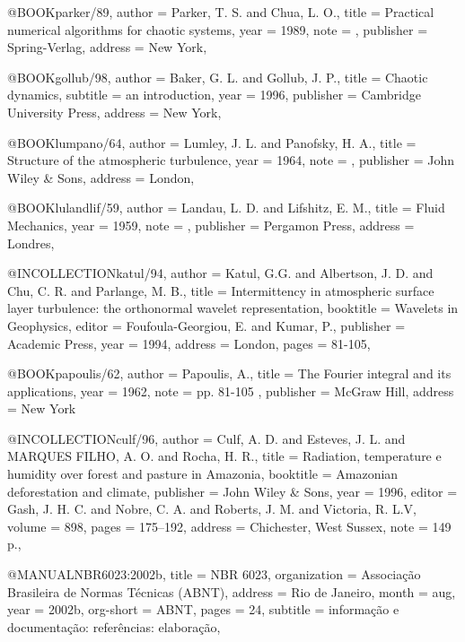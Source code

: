 @BOOK{parker/89,
author              = {Parker, T. S. and Chua, L. O.},
title               = {Practical numerical algorithms for chaotic systems},
year                = {1989},
note                = { },
publisher           = {Spring-Verlag},
address             = {New York},
}

@BOOK{gollub/98,
author              = {Baker, G. L. and Gollub, J. P.},
title               = {Chaotic dynamics},
subtitle 	          = {an introduction},
year                = {1996},
publisher           = {Cambridge University Press},
address             = {New York},
}

@BOOK{lumpano/64,
author              = {Lumley, J. L. and Panofsky, H. A.},
title               = {Structure of the atmospheric turbulence},
year                = {1964},
note                = { },
publisher           = {John Wiley \& Sons},
address             = {London},
}

@BOOK{lulandlif/59,
author              = {Landau, L. D. and Lifshitz, E. M.},
title               = {Fluid Mechanics},
year                = {1959},
note                = { },
publisher           = {Pergamon Press},
address             = {Londres},
}


@INCOLLECTION{katul/94, 
   author = {Katul, G.G. and Albertson, J. D. and Chu, C. R. and Parlange, M. B.},
   title  = {Intermittency in atmospheric surface layer turbulence: the orthonormal wavelet representation},
   booktitle  = {Wavelets in Geophysics},
   editor = {Foufoula-Georgiou, E. and Kumar, P.},
   publisher  = {Academic Press},
   year       = {1994},
   address    = {London},
   pages      = {81-105},   
}

@BOOK{papoulis/62,
 author              = {Papoulis, A.},
 title               = { The Fourier integral and its applications},
 year                = 1962,
 note                = {pp. 81-105 },
 publisher           = { McGraw Hill},
 address             = { New York}
}

@INCOLLECTION{culf/96,
  author = {Culf, A. D. and Esteves, J. L. and {MARQUES FILHO}, A. O. and Rocha, H. R.},
  title = {Radiation, temperature e humidity over forest and pasture in Amazonia},
  booktitle = {Amazonian deforestation and climate},
  publisher = {John Wiley \& Sons},
  year = {1996},
  editor = {Gash, J. H. C. and Nobre, C. A. and Roberts, J. M. and Victoria, R. L.V},
  volume = {898},
  pages = {175--192},
  address = {Chichester, West Sussex},
  note = {149 p.},
}

@MANUAL{NBR6023:2002b,
  title = {{NBR} 6023},
  organization = {Associa{\c{c}}{\~a}o Brasileira de Normas T{\'e}cnicas (ABNT)},
  address = {Rio de Janeiro},
  month = aug,
  year = {2002b},
  org-short = {ABNT},
  pages = {24},
  subtitle = {informa{\c{c}}{\~a}o e documenta{\c{c}}{\~a}o: refer{\^e}ncias: elabora{\c{c}}{\~a}o},
}

